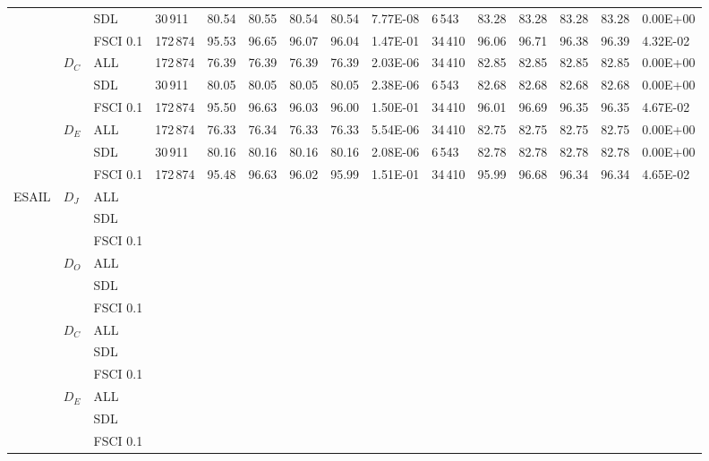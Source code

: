 \begin{table*}[h]
\begin{tabular}{|lllllllllllllll|}
 & & SDL & 30\,911 & 80.54  & 80.55  & 80.54 & 80.54   & 7.77E-08 & 6\,543   & 83.28  & 83.28  & 83.28 & 83.28   & 0.00E+00    \\
 & & FSCI 0.1    & 172\,874& 95.53  & 96.65  & 96.07 & 96.04   & 1.47E-01  & 34\,410  & 96.06  & 96.71  & 96.38 & 96.39   & 4.32E-02    \\
 & \multirow{3}{*}{$D_C$}    & ALL& 172\,874 & 76.39  & 76.39  & 76.39 & 76.39   & 2.03E-06  & 34\,410  & 82.85  & 82.85  & 82.85 & 82.85   & 0.00E+00    \\
 & & SDL & 30\,911 & 80.05  & 80.05  & 80.05 & 80.05   & 2.38E-06 & 6\,543   & 82.68  & 82.68  & 82.68 & 82.68   & 0.00E+00    \\
 & & FSCI 0.1   & 172\,874 & 95.50  & 96.63  & 96.03 & 96.00   & 1.50E-01 & 34\,410   & 96.01  & 96.69  & 96.35 & 96.35   & 4.67E-02    \\
 & \multirow{3}{*}{$D_E$} & ALL & 172\,874& 76.33  & 76.34  & 76.33 & 76.33   & 5.54E-06 & 34\,410   & 82.75  & 82.75  & 82.75 & 82.75   & 0.00E+00    \\
 & & SDL & 30\,911 & 80.16  & 80.16  & 80.16 & 80.16   & 2.08E-06 & 6\,543   & 82.78  & 82.78  & 82.78 & 82.78   & 0.00E+00    \\
 & & FSCI 0.1   & 172\,874 & 95.48  & 96.63  & 96.02 & 95.99   & 1.51E-01  & 34\,410  & 95.99  & 96.68  & 96.34 & 96.34   & 4.65E-02   \\
\hline
\multirow{12}{*}{ESAIL} & \multirow{3}{*}{$D_J$}   & ALL & & &    &  & & & &    &  &    \\
 & & SDL & & &    &  & & & &    &  &    \\
 & & FSCI 0.1    & & &    &  & & & &    &  & \\
 & \multirow{3}{*}{$D_O$}    & ALL & & &    &  & & & &    &  &    \\
 & & SDL & & &    &  & & & &    &  & \\
 & & FSCI 0.1    & & &    &  & & & &    &  & \\
 & \multirow{3}{*}{$D_C$}    & ALL & & &    &  & & & &    &  &    \\
 & & SDL & & &    &  & & & &    &  &    \\
 & & FSCI 0.1   & & &    &  & & & &    &  & \\
 & \multirow{3}{*}{$D_E$} & ALL & & &    &  & & & &    &  &    \\
 & & SDL & & &    &  & & & &    &  &    \\
 & & FSCI 0.1   & & &    &  & & & &    &  &    \\
\hline
\end{tabular}
\end{table*}










